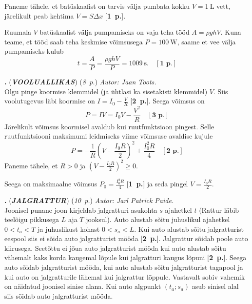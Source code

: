 \documentclass[12pt,a5paper]{article}
\newcommand{\numb}[1]{\textbf{\large #1}}
\newcommand{\nimi}[1]{(\textsl{\small #1})}
\newcommand{\punktid}[1]{(\emph{#1~p.})}
\newcounter{ylesanne}
\newcommand{\yl}[1]{\addtocounter{ylesanne}{1}\newpage\numb{\theylesanne.} \nimi{\textbf{#1}} \newblock{}}
\newcommand{\pp}[1]{[\textbf{#1~p.}]}
\newcommand{\autor}[1]{\emph{ Autor: #1.\\}}
\begin{document}
Paneme tähele, et batüskaafist on tarvis välja pumbata kokku $V=\SI{1}{\liter}$ vett, järelikult peab kehtima $V=S\Delta x$ \pp{1}.

Ruumala $V$ batüskaafist välja pumpamiseks on vaja teha tööd $A=\rho g h V$. Kuna teame, et tööd saab teha keskmise võimsusega $P=\SI{100}{\W}$, saame et vee välja pumpamiseks kulub
$$t=\frac{A}{P}=\frac{\rho g h V}{P}=\SI{1009}{\s}. \quad \pp{1}$$

\yl{VOOLUALLIKAS}\punktid{8}\autor{Jaan Toots}
Olgu pinge koormise klemmidel (ja ühtlasi ka sisetakisti klemmidel) $V$.
Siis voolutugevus läbi koormise on $I = I_0 - \frac VR$ \pp2. Seega võimsus on
$$P = IV = I_0V - \frac{V^2}R \quad \pp3$$
Järelikult võimsus koormisel avaldub kui ruutfunktsioon pingest. Selle ruutfunktsiooni maksimumi leidmiseks viime võimsuse avaldise kujule
$$P=-\frac1R \left(V - \frac{I_0R}2\right)^2 + \frac{I_0^2R}4 \quad \pp2$$
Paneme tähele, et $R>0$ ja $(V - \frac{I_0R}{2})^2 \ge 0$. \par
Seega on maksimaalne võimsus $P_0 = \frac{I_0^2R}{4}$ \pp1 ja seda pingel $V = \frac{I_0R}{2}$.



\yl{JALGRATTUR}\punktid{10}\autor{Jarl Patrick Paide}
Joonisel punane joon kirjeldab jalgratturi asukohta $s$ ajahetkel $t$ (Rattur läbib teelõigu pikkusega $L$ aja $T$ jooksul). Auto alustab sõitu juhuslikul ajahetkel $0 < t_a < T$ ja juhuslikust kohast $0 < s_a < L$. Kui auto alustab sõitu jalgratturist eespool siis ei sõida auto jalgratturist mööda \pp{2}. Jalgrattur sõidab poole auto kiirusega. Seetõttu ei jõua auto jalgratturist mööda kui auto alustab sõitu vähemalt kaks korda kaugemal lõpule kui jalgratturi kaugus lõpuni \pp{2}. Seega auto sõidab jalgratturist mööda, kui auto alustab sõitu jalgratturist tagapool ja kui auto on jalgratturile lähemal kui jalgrattur lõppule. Vastavalt sobiv vahemik on näidatud joonisel sinise alana. Kui auto algpunkt $(t_a; s_a)$ asub sinisel alal siis sõidab auto jalgratturist mööda.

\begin{figure}[H]
  \centering
\end{figure}
\end{document}
